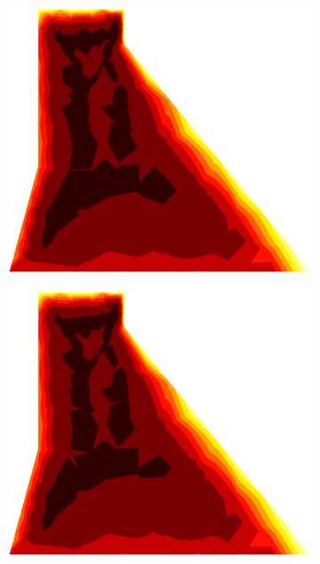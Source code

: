 \documentclass[10pt, a4paper]{article}
\begin{document}
\begin{figure}[H]
\begin{subfigure}[H]{0.19\textwidth}
		\includegraphics[width=1.2\textwidth]{fig/16.eps}
	\end{subfigure}
	\begin{subfigure}[H]{0.19\textwidth}
		\includegraphics[width=1.2\textwidth]{fig/17.eps}
	\end{subfigure}
	\begin{subfigure}[H]{0.19\textwidth}

\end{subfigure}
\end{figure}
\end{document}
